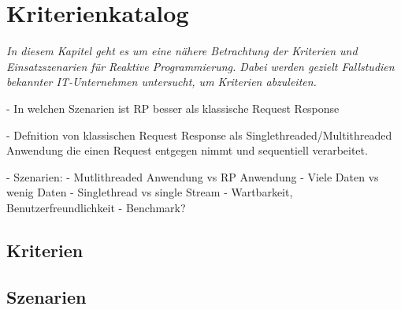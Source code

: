 \chapter{Kriterienkatalog}
\label{chap:kriterienkatalog}
\emph{
In diesem Kapitel geht es um eine nähere Betrachtung der Kriterien und Einsatzszenarien für Reaktive Programmierung. Dabei werden gezielt Fallstudien bekannter IT-Unternehmen untersucht, um Kriterien abzuleiten.
}

- In welchen Szenarien ist RP besser als klassische Request Response

- Defnition von klassischen Request Response als Singlethreaded/Multithreaded Anwendung die einen Request entgegen nimmt und sequentiell verarbeitet.

- Szenarien: 
	- Mutlithreaded Anwendung vs RP Anwendung 
	- Viele Daten vs wenig Daten
	- Singlethread vs single Stream
	- Wartbarkeit, Benutzerfreundlichkeit
	- Benchmark?
	
	
\section{Kriterien}
\section{Szenarien}